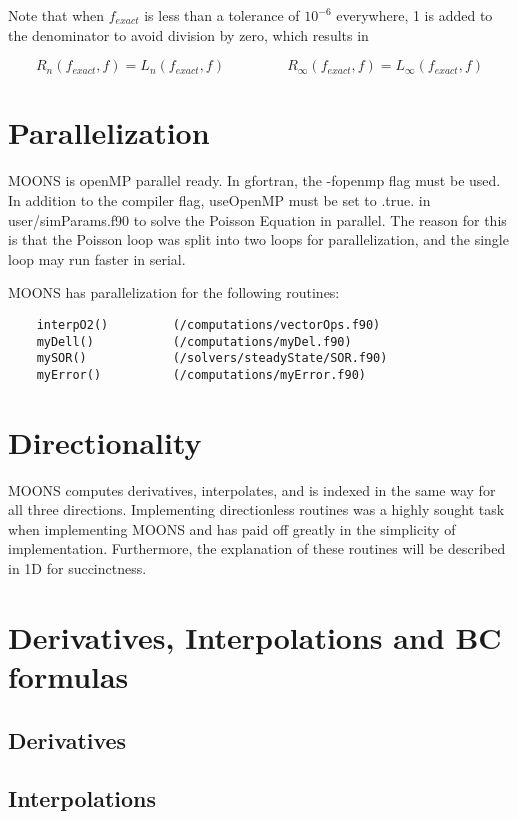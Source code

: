 \documentclass[11pt]{article}
\newcommand{\eqtab}{\;\;\;\;\;\;\;\;\;\;\;\;\;\;\;\;}
\begin{document}
Note that when $f_{exact}$ is less than a tolerance of $10^{-6}$ everywhere, 1 is added to the denominator to avoid division by zero, which results in

\begin{equation}
R_{n}(f_{exact},f) = L_n(f_{exact},f) \eqtab
R_{\infty}(f_{exact},f) = L_\infty(f_{exact},f)
\end{equation}

\section{Parallelization}
MOONS is openMP parallel ready. In gfortran, the -fopenmp flag must be used. In addition to the compiler flag, useOpenMP must be set to .true. in user/simParams.f90 to solve the Poisson Equation in parallel. The reason for this is that the Poisson loop was split into two loops for parallelization, and the single loop may run faster in serial.

MOONS has parallelization for the following routines:

\begin{lstlisting}
    interpO2()         (/computations/vectorOps.f90)
    myDell()           (/computations/myDel.f90)
    mySOR()            (/solvers/steadyState/SOR.f90)
    myError()          (/computations/myError.f90)
\end{lstlisting}

\section{Directionality}
MOONS computes derivatives, interpolates, and is indexed in the same way for all three directions. Implementing directionless routines was a highly sought task when implementing MOONS and has paid off greatly in the simplicity of implementation. Furthermore, the explanation of these routines will be described in 1D for succinctness.

\section{Derivatives, Interpolations and BC formulas}
\subsection{Derivatives}

\subsection{Interpolations}
\end{document}
